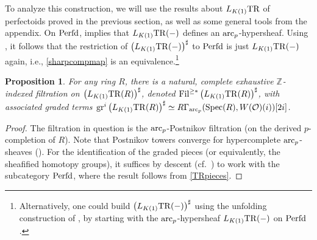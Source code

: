 \documentclass{amsart}
\newcommand{\fil}{\mathrm{Fil}}
\newcommand{\gr}{\mathrm{gr}}
\newtheorem{proposition}[theorem]{Proposition}
\theoremstyle{definition}
\newcommand{\spec}{\mathrm{Spec}}
\begin{document}
To analyze this construction, we will use the results about 
$L_{K(1)} \mathrm{TR}$ of perfectoids proved in the previous section, as well as some
general tools from the appendix. 
On $\mathrm{Perfd}$,  implies that $L_{K(1)} \mathrm{TR}(-)$ defines an
$\mathrm{arc}_{{p}}$-hypersheaf. 
Using , it follows that the
restriction of $\left(L_{K(1)}
\mathrm{TR}(-)\right)^{\sharp}$ to $\mathrm{Perfd}$ is just $L_{K(1)} \mathrm{TR}(-)$ again, i.e.,
\eqref{sharpcompmap} is an equivalence.\footnote{Alternatively, one could build 
$\left( L_{K(1)} \mathrm{TR}(-) \right)^{\sharp}$ using the unfolding construction of
, by starting with the $\mathrm{arc}_{{p}}$-hypersheaf $L_{K(1)} \mathrm{TR}(-)$ on
$\mathrm{Perfd}$.
} 

\begin{proposition} 
For any ring $R$, 
there is a natural, complete exhaustive $\mathbb{Z}_{}$-indexed filtration on 
$\left( L_{K(1)} \mathrm{TR}(R) \right)^{\sharp}$, 
denoted 
$\fil^{\geq \ast}\left( L_{K(1)} \TR(R) \right)^{\sharp}$, with associated
graded terms
$\gr^i \left( L_{K(1)} \TR(R) \right)^{\sharp} \simeq R \Gamma_{\arc}(
\spec(R), W(\mathcal{O})(i))[2i]$.  
\end{proposition} 
\begin{proof} 
The filtration in question is the $\mathrm{arc}_{{p}}$-Postnikov filtration (on the derived
$p$-completion of $R$). 
Note that Postnikov towers converge for hypercomplete $\mathrm{arc}_{{p}}$-sheaves
(). 
For the identification of the graded pieces (or equivalently, the sheafified
homotopy groups), it suffices by descent (cf.~) to work with the subcategory $\mathrm{Perfd}$,
where the result follows from \eqref{TRpieces}. 
\end{proof} 
\end{document}
